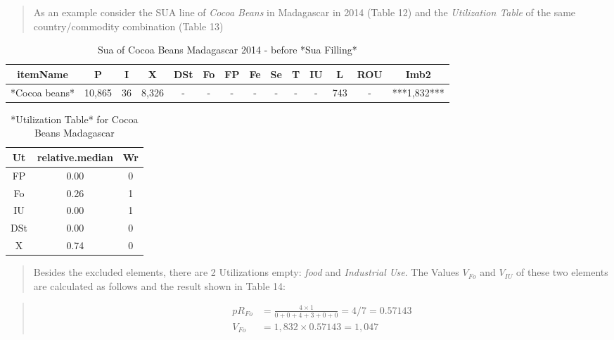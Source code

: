 \documentclass[]{article}
\begin{document}
\begin{quote}
As an example consider the SUA line of \emph{Cocoa Beans} in Madagascar
in 2014 (Table 12) and the \emph{Utilization Table} of the same
country/commodity combination (Table 13)
\end{quote}

\begin{table}

\caption{\label{tab:t11}Sua of Cocoa Beans Madagascar 2014 - before *Sua Filling*}
\centering
\begin{tabular}[t]{c|c|c|c|c|c|c|c|c|c|c|c|c|c}
\hline
itemName & P & I & X & DSt & Fo & FP & Fe & Se & T & IU & L & ROU & Imb2\\
\hline
*Cocoa beans* & 10,865 & 36 & 8,326 & - & - & - & - & - & - & - & 743 & - & ***1,832***\\
\hline
\end{tabular}
\end{table}

\begin{table}

\caption{\label{tab:t12}*Utilization Table* for Cocoa Beans Madagascar}
\centering
\begin{tabular}[t]{c|c|c}
\hline
Ut & relative.median & Wr\\
\hline
FP & 0.00 & 0\\
\hline
Fo & 0.26 & 1\\
\hline
IU & 0.00 & 1\\
\hline
DSt & 0.00 & 0\\
\hline
X & 0.74 & 0\\
\hline
\end{tabular}
\end{table}

\begin{quote}
Besides the excluded elements, there are 2 Utilizations empty:
\emph{food} and \emph{Industrial Use}. The Values \(V_{Fo}\) and
\(V_{IU}\) of these two elements are calculated as follows and the
result shown in Table 14:
\end{quote}

\begin{quote}
\begin{equation}
\begin{aligned}
pR_{Fo} &= \frac{4\times 1}{0 + 0 + 4 + 3 + 0 + 0} = 4/7 = 0.57143 \\
V_{Fo} &= 1,832 \times 0.57143 = 1,047 
\end{aligned}
\end{equation}
\end{quote}
\end{document}

